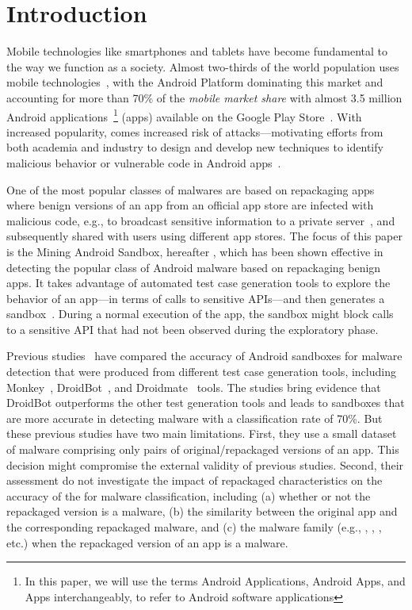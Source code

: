 \section{Introduction}\label{sec:introduction}

Mobile technologies like smartphones and tablets have become fundamental to the way we function as a society. Almost two-thirds of the world population
uses mobile technologies~\cite{Comscore,DBLP:journals/tse/MartinSJZH17}, with the
Android Platform dominating this market and accounting for more than 70\% of the \emph{mobile
market share} with almost 3.5 million Android applications~\footnote{In this paper, we will use the terms Android Applications, Android Apps, and Apps interchangeably, to refer to Android software applications} (apps)
available on the Google Play Store~\cite{Statista}. 
With increased popularity, comes increased risk of attacks---motivating efforts from both academia and industry to design and develop new techniques
to identify malicious behavior or vulnerable code in Android apps~\cite{10.1145/3017427}.


One of the most popular classes of malwares are based on repackaging apps~\cite{DBLP:conf/wcre/BaoLL18,le2018towards} where benign
versions of an app from an official app store are
infected with malicious code, e.g., to broadcast
sensitive information to a private server~\cite{DBLP:journals/tse/LiBK21}, and subsequently shared
with users using different app stores.  The focus of this paper is the Mining Android Sandbox, hereafter \mas, which has been shown effective
in detecting the popular class of Android malware based on 
repackaging benign apps. 
It  takes advantage of automated test case generation tools 
to explore the behavior of an app---in terms of calls to sensitive APIs---and then
generates a sandbox~\cite{DBLP:conf/icse/JamrozikSZ16}. During a normal
execution of the app, the sandbox might block calls to a sensitive API
that had not been observed during the exploratory phase. 


Previous studies~\cite{DBLP:conf/wcre/BaoLL18,DBLP:journals/jss/CostaMMSSBNR22} 
have compared the accuracy of  Android sandboxes for malware detection 
that were produced 
from 
different test case generation tools, including Monkey~\cite{Monkey}, DroidBot~\cite{DBLP:conf/icse/LiYGC17}, and Droidmate~\cite{DBLP:conf/kbse/BorgesHZ18} tools.
The studies bring evidence that 
DroidBot outperforms the other test generation tools and leads to sandboxes that are more accurate in detecting malware with a classification rate of 70\%.
But these previous studies have two main limitations.
First, they use a small dataset of malware comprising only \appsSmall pairs of original/repackaged versions of an app. This decision
might compromise the external validity of previous studies. Second, their assessment do not investigate
the impact of repackaged characteristics on the accuracy of the \mas for malware classification, including
(a) whether or not the repackaged version is a malware, (b) the similarity between the original app and the corresponding repackaged malware,
and (c) the malware family (e.g., , , , etc.) when the repackaged
version of an app is a malware.

